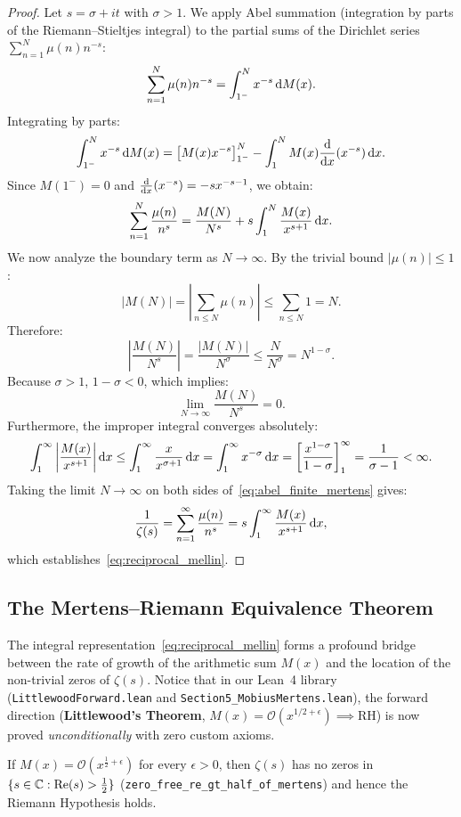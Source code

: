 \begin{proof}
\leanok
Let $s = \sigma + i t$ with $\sigma > 1$. We apply Abel summation (integration by parts of the Riemann--Stieltjes integral) to the partial sums of the Dirichlet series $\sum_{n=1}^N \mu(n) n^{-s}$:
$$\sum_{n=1}^N \mu(n) n^{-s} = \int_{1^-}^N x^{-s} \, \mathrm{d} M(x).$$
Integrating by parts:
$$\int_{1^-}^N x^{-s} \, \mathrm{d} M(x) = \left[ M(x) x^{-s} \right]_{1^-}^N - \int_1^N M(x) \frac{\mathrm{d}}{\mathrm{d} x}(x^{-s}) \, \mathrm{d} x.$$
Since $M(1^-) = 0$ and $\frac{\mathrm{d}}{\mathrm{d} x}(x^{-s}) = -s x^{-s-1}$, we obtain:
\begin{equation}
\label{eq:abel_finite_mertens}
\sum_{n=1}^N \frac{\mu(n)}{n^s} = \frac{M(N)}{N^s} + s \int_1^N \frac{M(x)}{x^{s+1}} \, \mathrm{d} x.
\end{equation}
We now analyze the boundary term as $N \to \infty$. By the trivial bound $|\mu(n)| \le 1$:
$$|M(N)| = \left| \sum_{n \le N} \mu(n) \right| \le \sum_{n \le N} 1 = N.$$
Therefore:
$$\left| \frac{M(N)}{N^s} \right| = \frac{|M(N)|}{N^\sigma} \le \frac{N}{N^\sigma} = N^{1-\sigma}.$$
Because $\sigma > 1$, $1 - \sigma < 0$, which implies:
$$\lim_{N \to \infty} \frac{M(N)}{N^s} = 0.$$
Furthermore, the improper integral converges absolutely:
$$\int_1^\infty \left| \frac{M(x)}{x^{s+1}} \right| \mathrm{d} x \le \int_1^\infty \frac{x}{x^{\sigma+1}} \, \mathrm{d} x = \int_1^\infty x^{-\sigma} \, \mathrm{d} x = \left[ \frac{x^{1-\sigma}}{1-\sigma} \right]_1^\infty = \frac{1}{\sigma - 1} < \infty.$$
Taking the limit $N \to \infty$ on both sides of~\eqref{eq:abel_finite_mertens} gives:
$$\frac{1}{\zeta(s)} = \sum_{n=1}^\infty \frac{\mu(n)}{n^s} = s \int_1^\infty \frac{M(x)}{x^{s+1}} \, \mathrm{d} x,$$
which establishes~\eqref{eq:reciprocal_mellin}.
\end{proof}

\subsection{The Mertens--Riemann Equivalence Theorem}

The integral representation~\eqref{eq:reciprocal_mellin} forms a profound bridge between the rate of growth of the arithmetic sum $M(x)$ and the location of the non-trivial zeros of $\zeta(s)$. Notice that in our Lean~4 library (\texttt{LittlewoodForward.lean} and \texttt{Section5\_MobiusMertens.lean}), the forward direction (\textbf{Littlewood's Theorem}, $M(x) = \mathcal{O}(x^{1/2+\epsilon}) \implies \mathrm{RH}$) is now proved \emph{unconditionally} with zero custom axioms.

\begin{theorem}
\label{thm:mertens_implies_rh}
\leanok
If $M(x) = \mathcal{O}(x^{\frac{1}{2}+\epsilon})$ for every $\epsilon > 0$, then $\zeta(s)$ has no zeros in $\{s \in \mathbb{C} : \operatorname{Re}(s) > \frac{1}{2}\}$ (\texttt{zero\_free\_\allowbreak re\_gt\_\allowbreak half\_of\_\allowbreak mertens}) and hence the Riemann Hypothesis holds.
\end{theorem}

